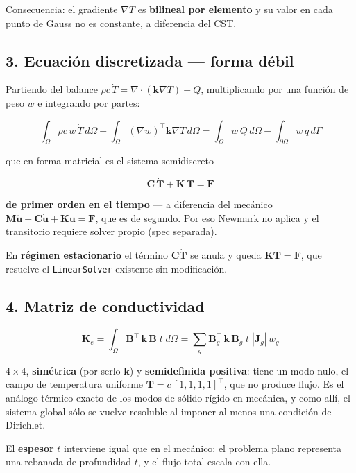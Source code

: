 \documentclass[11pt,letterpaper,oneside]{report}
\begin{document}
Consecuencia: el gradiente $\nabla T$ es \textbf{bilineal por elemento} y su valor en cada punto de Gauss no es constante, a diferencia del CST.

\subsection{3. Ecuación discretizada --- forma débil}

Partiendo del balance $\rho c\,\dot T = \nabla\cdot(\mathbf k\nabla T) + Q$, multiplicando por una función de peso $w$ e integrando por partes:

\[
\int_\Omega \rho c\,w\,\dot T\,d\Omega + \int_\Omega (\nabla w)^\top \mathbf k \nabla T\,d\Omega = \int_\Omega w\,Q\,d\Omega - \int_{\partial\Omega} w\,\bar q\,d\Gamma
\]

que en forma matricial es el sistema semidiscreto

\[
\mathbf C\,\dot{\mathbf T} + \mathbf K\,\mathbf T = \mathbf F
\]

\textbf{de primer orden en el tiempo} --- a diferencia del mecánico $\mathbf M\ddot{\mathbf u} + \mathbf C\dot{\mathbf u} + \mathbf K\mathbf u = \mathbf F$, que es de segundo. Por eso Newmark no aplica y el transitorio requiere solver propio (spec separada).

En \textbf{régimen estacionario} el término $\mathbf C\dot{\mathbf T}$ se anula y queda $\mathbf K\mathbf T = \mathbf F$, que resuelve el \texttt{LinearSolver} existente sin modificación.

\subsection{4. Matriz de conductividad}

\[
\mathbf K_e = \int_\Omega \mathbf B^\top\,\mathbf k\,\mathbf B\;t\;d\Omega = \sum_{g} \mathbf B_g^\top\,\mathbf k\,\mathbf B_g\;t\;|\mathbf J_g|\,w_g
\]

$4\times4$, \textbf{simétrica} (por serlo $\mathbf k$) y \textbf{semidefinida positiva}: tiene un modo nulo, el campo de temperatura uniforme $\mathbf T = c\,[1,1,1,1]^\top$, que no produce flujo. Es el análogo térmico exacto de los modos de sólido rígido en mecánica, y como allí, el sistema global sólo se vuelve resoluble al imponer al menos una condición de Dirichlet.

El \textbf{espesor} $t$ interviene igual que en el mecánico: el problema plano representa una rebanada de profundidad $t$, y el flujo total escala con ella.
\end{document}

